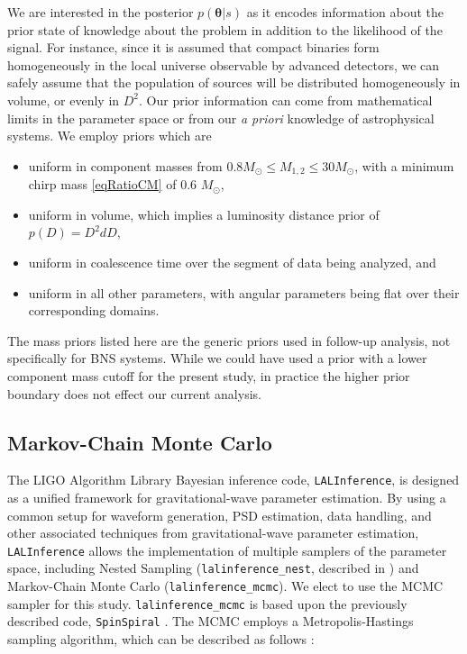 \documentclass[11pt,a4paper]{emulateapj} 
\newcommand{\thpara}{\boldsymbol{\theta}}
\begin{document}
We are interested in the posterior $p(\thpara | s)$ as it encodes
information about the prior state of knowledge about the problem in
addition to the likelihood of the signal.  For instance, since it is
assumed that compact binaries form homogeneously in the local universe
observable by advanced detectors, we can safely assume that the
population of sources will be distributed homogeneously in volume, or
evenly in $D^2$.  Our prior information can come from mathematical
limits in the parameter space or from our \textit{a priori} knowledge
of astrophysical systems.  We employ priors which are

\begin{itemize}
\item uniform in component masses from $0.8M_{\odot} \leq M_{1,2} \leq
  30M_{\odot}$, with a minimum chirp mass \eqref{eqRatioCM} of 0.6
  $M_{\odot}$,
\item uniform in volume, which implies a luminosity distance prior of
  $p(D) = D^2 dD$,
\item uniform in coalescence time over the segment of data being
  analyzed, and
\item uniform in all other parameters, with angular parameters being
  flat over their corresponding domains.
\end{itemize}

\noindent The mass priors listed here are the generic priors used in
follow-up analysis, not specifically for BNS systems.  While we could
have used a prior with a lower component mass cutoff for the present
study, in practice the higher prior boundary does not effect our
current analysis.


  
\subsection{Markov-Chain Monte Carlo}
\label{MCMCSection}
  
The LIGO Algorithm Library Bayesian inference code,
\texttt{LALInference}, is designed as a unified framework for
gravitational-wave parameter estimation.  By using a common setup for
waveform generation, PSD estimation, data handling, and other
associated techniques from gravitational-wave parameter estimation,
\texttt{LALInference} allows the implementation of multiple samplers
of the parameter space, including Nested Sampling
(\texttt{lalinference\_nest}, described in \cite{nestedsampling2010})
and Markov-Chain Monte Carlo (\texttt{lalinference\_mcmc}).  We elect
to use the MCMC sampler for this study.  \texttt{lalinference\_mcmc}
is based upon the previously described code, \texttt{SpinSpiral}
\citep{spinspiral2009, spinspiral2010}.  The MCMC employs a
Metropolis-Hastings sampling algorithm, which can be described as
follows \citep{Gilks99}:
  
\end{document}
